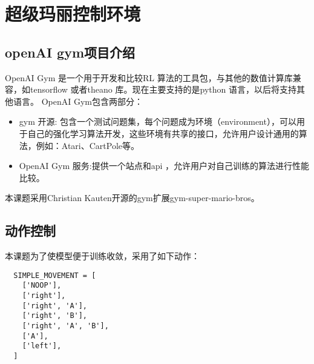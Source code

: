 \section{超级玛丽控制环境}
\subsection{openAI gym项目介绍}
OpenAI Gym 是一个用于开发和比较RL 算法的工具包，与其他的数值计算库兼容，如tensorflow 或者theano 库。现在主要支持的是python 语言，以后将支持其他语言。
OpenAI Gym包含两部分：
\begin{itemize}
  \item gym 开源: 包含一个测试问题集，每个问题成为环境（environment），可以用于自己的强化学习算法开发，这些环境有共享的接口，允许用户设计通用的算法，例如：Atari、CartPole等。
  \item OpenAI Gym 服务:提供一个站点和api ，允许用户对自己训练的算法进行性能比较。
\end{itemize}
本课题采用Christian Kauten开源的gym扩展gym-super-mario-bros。
\subsection{动作控制}
本课题为了使模型便于训练收敛，采用了如下动作：
\begin{lstlisting}
  SIMPLE_MOVEMENT = [
    ['NOOP'],
    ['right'],
    ['right', 'A'],
    ['right', 'B'],
    ['right', 'A', 'B'],
    ['A'],
    ['left'],
  ]
\end{lstlisting}